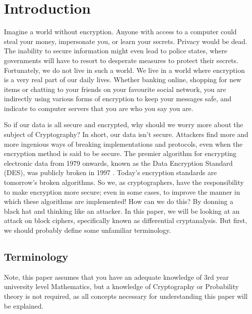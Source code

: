 



\chapter{Introduction} \label{c:introduction}
Imagine a world without encryption. Anyone with access to a computer could
steal your money, impersonate you, or learn your secrets.  Privacy would be
dead. The inability to secure information might even lead to police states,
where governments will have to resort to desperate measures to protect their
secrets.  Fortunately, we do not live in such a world. We live in a world where
encryption is a very real part of our daily lives. Whether banking online,
shopping for new items or chatting to your friends on your favourite social
network, you are indirectly using various forms of encryption to keep your
messages safe, and indicate to computer servers that you are who you say you
are.

So if our data is all secure and encrypted, why should we worry more about the
subject of Cryptography? In short, our data isn't secure. Attackers find more
and more ingenious ways of breaking implementations and protocols, even when
the encryption method is said to be secure. The premier algorithm for
encrypting electronic data from 1979 onwards, known as the Data Encryption
Standard (DES), was publicly broken in 1997 \cite[]{interhack}. Today's
encryption standards are tomorrow's broken algorithms. So we, as
cryptographers, have the responsibility to make encryption more secure; even in
some cases, to improve the manner in which these algorithms are implemented!
How can we do this? By donning a black hat and thinking like an attacker. In
this paper, we will be looking at an attack on block ciphers, specifically
known as differential cryptanalysis. But first, we should probably define some
unfamiliar terminology.

\section{Terminology}

\begin{rem}
Note, this paper assumes that you have an adequate knowledge of 3rd year
university level Mathematics, but a knowledge of Cryptography or Probability
theory is not required, as all concepts necessary for understanding this paper
will be explained.
\end{rem}

